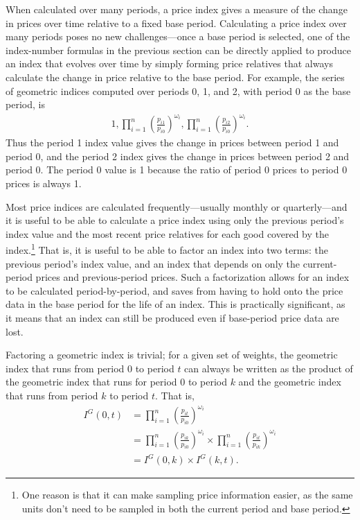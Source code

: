 \documentclass[
]{article}
\begin{document}
When calculated over many periods, a price index gives a measure of the change in prices over time relative to a fixed base period. Calculating a price index over many periods poses no new challenges---once a base period is selected, one of the index-number formulas in the previous section can be directly applied to produce an index that evolves over time by simply forming price relatives that always calculate the change in price relative to the base period. For example, the series of geometric indices computed over periods 0, 1, and 2, with period 0 as the base period, is
\begin{align*}
1, \prod_{i = 1}^{n} \left(\frac{p_{i1}}{p_{i0}}\right)^{\omega_{i}}, \prod_{i = 1}^{n} \left(\frac{p_{i2}}{p_{i0}}\right)^{\omega_{i}}.
\end{align*}
Thus the period 1 index value gives the change in prices between period 1 and period 0, and the period 2 index gives the change in prices between period 2 and period 0. The period 0 value is 1 because the ratio of period 0 prices to period 0 prices is always 1.

Most price indices are calculated frequently---usually monthly or quarterly---and it is useful to be able to calculate a price index using only the previous period's index value and the most recent price relatives for each good covered by the index.\footnote{One reason is that it can make sampling price information easier, as the same units don't need to be sampled in both the current period and base period.} That is, it is useful to be able to factor an index into two terms: the previous period's index value, and an index that depends on only the current-period prices and previous-period prices. Such a factorization allows for an index to be calculated period-by-period, and saves from having to hold onto the price data in the base period for the life of an index. This is practically significant, as it means that an index can still be produced even if base-period price data are lost.

Factoring a geometric index is trivial; for a given set of weights, the geometric index that runs from period 0 to period \(t\) can always be written as the product of the geometric index that runs for period 0 to period \(k\) and the geometric index that runs from period \(k\) to period \(t\). That is,
\begin{align*}
I^{G}(0, t) &= \prod_{i = 1}^{n} \left(\frac{p_{it}}{p_{i0}}\right)^{\omega_i} \\
&= \prod_{i = 1}^{n} \left(\frac{p_{ik}}{p_{i0}}\right)^{\omega_i} \times \prod_{i = 1}^{n} \left(\frac{p_{it}}{p_{ik}}\right)^{\omega_i} \\
&= I^{G}(0, k) \times I^{G}(k, t).
\end{align*}
\end{document}
